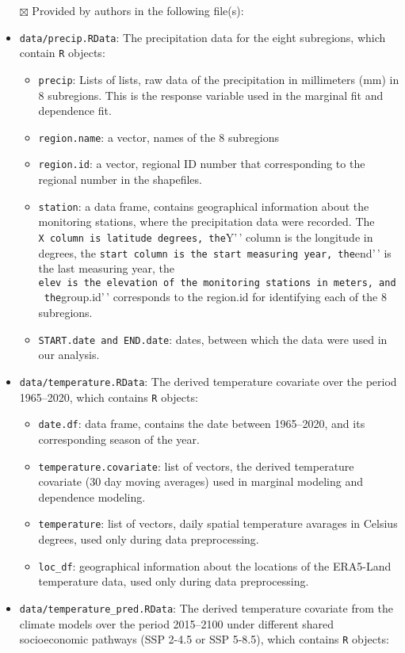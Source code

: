 \documentclass[
]{article}
\providecommand{\tightlist}{%
  \setlength{\itemsep}{0pt}\setlength{\parskip}{0pt}}
\begin{document}
\begin{itemize}
\tightlist
\item[$\boxtimes$]
  Provided by authors in the following file(s):
\item
  \texttt{data/precip.RData}: The precipitation data for the eight
  subregions, which contain \texttt{R} objects:

  \begin{itemize}
  \tightlist
  \item
    \texttt{precip}: Lists of lists, raw data of the precipitation in
    millimeters (mm) in 8 subregions. This is the response variable used
    in the marginal fit and dependence fit.
  \item
    \texttt{region.name}: a vector, names of the 8 subregions
  \item
    \texttt{region.id}: a vector, regional ID number that corresponding
    to the regional number in the shapefiles.
  \item
    \texttt{station}: a data frame, contains geographical information
    about the monitoring stations, where the precipitation data were
    recorded. The
    \texttt{X\textquotesingle{}\textquotesingle{}\ column\ is\ latitude\ degrees,\ the}Y'\,'
    column is the longitude in degrees, the
    \texttt{start\textquotesingle{}\textquotesingle{}\ column\ is\ the\ start\ measuring\ year,\ the}end'\,'
    is the last measuring year, the
    \texttt{elev\textquotesingle{}\textquotesingle{}\ is\ the\ elevation\ of\ the\ monitoring\ stations\ in\ meters,\ and\ the}group.id'\,'
    corresponds to the region.id for identifying each of the 8
    subregions.
  \item
    \texttt{START.date\ and\ END.date}: dates, between which the data
    were used in our analysis.
  \end{itemize}
\item
  \texttt{data/temperature.RData}: The derived temperature covariate
  over the period 1965--2020, which contains \texttt{R} objects:

  \begin{itemize}
  \tightlist
  \item
    \texttt{date.df}: data frame, contains the date between 1965--2020,
    and its corresponding season of the year.
  \item
    \texttt{temperature.covariate}: list of vectors, the derived
    temperature covariate (30 day moving averages) used in marginal
    modeling and dependence modeling.
  \item
    \texttt{temperature}: list of vectors, daily spatial temperature
    avarages in Celsius degrees, used only during data preprocessing.
  \item
    \texttt{loc\_df}: geographical information about the locations of
    the ERA5-Land temperature data, used only during data preprocessing.
  \end{itemize}
\item
  \texttt{data/temperature\_pred.RData}: The derived temperature
  covariate from the climate models over the period 2015--2100 under
  different shared socioeconomic pathways (SSP 2-4.5 or SSP 5-8.5),
  which contains \texttt{R} objects:


\end{itemize}
\end{document}
